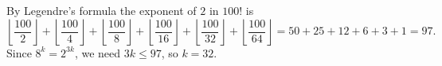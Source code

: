 By Legendre's formula the exponent of $2$ in $100!$ is
\[
\left\lfloor\dfrac{100}{2}\right\rfloor+\left\lfloor\dfrac{100}{4}\right\rfloor+\left\lfloor\dfrac{100}{8}\right\rfloor+\left\lfloor\dfrac{100}{16}\right\rfloor+\left\lfloor\dfrac{100}{32}\right\rfloor+\left\lfloor\dfrac{100}{64}\right\rfloor=50+25+12+6+3+1=97 .
\]
Since $8^k=2^{3k}$, we need $3k\le97$, so $k=\boxed{32}$.
